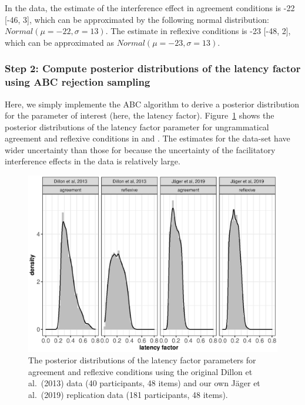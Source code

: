 \documentclass{cambridge7A}\usepackage[]{graphicx}\usepackage[]{color}
\makeatletter
\def\maxwidth{ %
  \ifdim\Gin@nat@width>\linewidth
    \linewidth
  \else
    \Gin@nat@width
  \fi
}
\newenvironment{knitrout}{}{} %
\makeatother
\begin{document}
In the \cite{JaegerMertzenVanDykeVasishth2019} data, 
the estimate of the interference effect in agreement conditions is -22 [-46, 3], which can be approximated by the following normal distribution: $Normal(\mu=-22,\sigma=13)$. The estimate in reflexive conditions is -23 [-48, 2], which can be approximated as  $Normal(\mu=-23,\sigma=13)$.
  


\subsubsection{Step 2: Compute posterior distributions of the latency factor using ABC rejection sampling}

Here, we simply implemente the ABC algorithm to derive a posterior distribution for the parameter of interest (here, the latency factor). Figure~\ref{fig:lfvalues} shows the posterior distributions of the latency factor parameter for ungrammatical agreement and reflexive conditions in \cite{DillonMishlerSloggett2013} and \cite{JaegerMertzenVanDykeVasishth2019}. The estimates for the \cite{DillonMishlerSloggett2013} data-set have wider uncertainty than those for \cite{JaegerMertzenVanDykeVasishth2019} because the uncertainty of the facilitatory interference effects in the data is relatively large.



\begin{figure}[!htbp]
\centering
\begin{knitrout}
\color{fgcolor}

{\centering \includegraphics[width=\maxwidth]{figures/fig-plotlf-1} 

}



\end{knitrout}
\caption{The posterior distributions of the latency factor parameters for agreement and reflexive conditions using the original Dillon et al.\ (2013) data (40 participants, 48 items) and our own Jäger et al.\ (2019) replication data (181 participants, 48 items).}\label{fig:lfvalues}
\end{figure}
\end{document}
